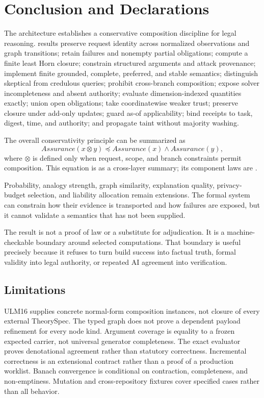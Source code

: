 \section{Conclusion and Declarations}
\label{sec:conclusion}

The architecture establishes a conservative composition discipline for legal reasoning. \formalized{} results preserve request identity across normalized observations and graph transitions; retain failures and nonempty partial obligations; compute a finite least Horn closure; constrain structured arguments and attack provenance; implement finite grounded, complete, preferred, and stable semantics; distinguish skeptical from credulous queries; prohibit cross-branch composition; expose solver incompleteness and absent authority; evaluate dimension-indexed quantities exactly; union open obligations; take coordinatewise weaker trust; preserve closure under add-only updates; guard as-of applicability; bind receipts to task, digest, time, and authority; and propagate taint without majority washing.

The overall conservativity principle can be summarized as
\begin{equation}
Assurance(x\otimes y)\preceq Assurance(x)\wedge Assurance(y),
\label{eq:overall-conservativity}
\end{equation}
where $\otimes$ is defined only when request, scope, and branch constraints permit composition. This equation is \derived{} as a cross-layer summary; its component laws are \formalized{}.

Probability, analogy strength, graph similarity, explanation quality, privacy-budget selection, and liability allocation remain \conjectured{} extensions. The formal system can constrain how their evidence is transported and how failures are exposed, but it cannot validate a semantics that has not been supplied.

The result is not a proof of law or a substitute for adjudication. It is a machine-checkable boundary around selected computations. That boundary is useful precisely because it refuses to turn build success into factual truth, formal validity into legal authority, or repeated AI agreement into verification.

\subsection*{Limitations}

ULM16 supplies concrete normal-form composition instances, not closure of every external TheorySpec. The typed graph does not prove a dependent payload refinement for every node kind. Argument coverage is equality to a frozen expected carrier, not universal generator completeness. The exact evaluator proves denotational agreement rather than statutory correctness. Incremental correctness is an extensional contract rather than a proof of a production worklist. Banach convergence is conditional on contraction, completeness, and non-emptiness. Mutation and cross-repository fixtures cover specified cases rather than all behavior.

